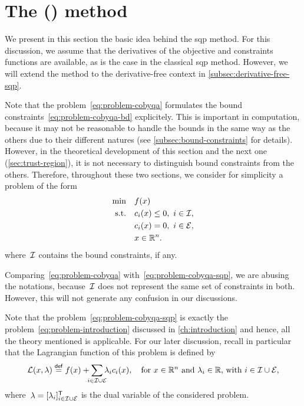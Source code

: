 \section{The  () method}

We present in this section the basic idea behind the \gls{sqp} method.
For this discussion, we assume that the derivatives of the objective and constraints functions are available, as is the case in the classical \gls{sqp} method.
However, we will extend the method to the derivative-free context in \cref{subsec:derivative-free-sqp}.

Note that the problem~\cref{eq:problem-cobyqa} formulates the bound constraints~\cref{eq:problem-cobyqa-bd} explicitely.
This is important in computation, because it may not be reasonable to handle the bounds in the same way as the others due to their different natures (see \cref{subsec:bound-constraints} for details).
However, in the theoretical development of this section and the next one (\cref{sec:trust-region}), it is not necessary to distinguish bound constraints from the others.
Therefore, throughout these two sections, we consider for simplicity a problem of the form
\begin{subequations}
    \label{eq:problem-cobyqa-sqp}
    \begin{align}
        \min        & \quad \obj(\iter) \label{eq:problem-cobyqa-sqp-obj}\\
        \text{s.t.} & \quad \con{i}(\iter) \le 0, ~ i \in \iub, \label{eq:problem-cobyqa-sqp-ub}\\
                    & \quad \con{i}(\iter) = 0, ~ i \in \ieq,\\
                    & \quad \iter \in \R^n. \nonumber
    \end{align}
\end{subequations}
where~$\mathcal{I}$ contains the bound constraints, if any.

\begin{remark}
    Comparing~\cref{eq:problem-cobyqa} with~\cref{eq:problem-cobyqa-sqp}, we are abusing the notations, because~$\mathcal{I}$ does not represent the same set of constraints in both.
    However, this will not generate any confusion in our discussions.
\end{remark}

Note that the problem~\cref{eq:problem-cobyqa-sqp} is exactly the problem~\cref{eq:problem-introduction} discussed in \cref{ch:introduction} and hence, all the theory mentioned is applicable.
For our later discussion, recall in particular that the Lagrangian function of this problem is defined by
\begin{equation*}
    \lag(\iter, \lambda) \eqdef \obj(\iter) + \sum_{\mathclap{i \in \iub \cup \ieq}} \lambda_i \con{i}(\iter), \quad \text{for~$\iter \in \R^n$ and~$\lambda_i \in \R$, with~$i \in \iub \cup \ieq$,}
\end{equation*}
where~$\lambda = [\lambda_i]_{i \in \mathcal{I} \cup \mathcal{E}}^{\mathsf{T}}$ is the dual variable of the considered problem.

